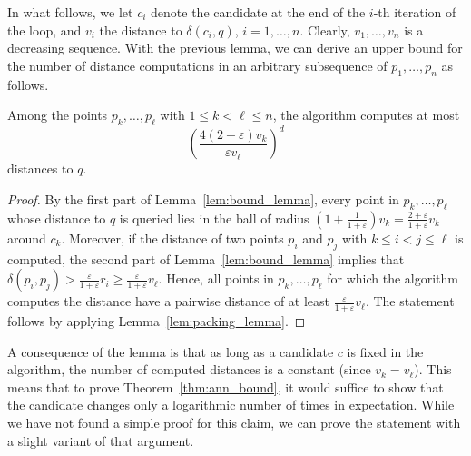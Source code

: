 \documentclass[a4paper,USenglish]{socg-lipics-v2018}
\newcommand{\eps}{\varepsilon}
\newcommand{\dist}{\delta}
\begin{document}
In what follows, we let $c_i$ denote the candidate
at the end of the $i$-th iteration of the loop, and $v_i$
the distance to $\dist(c_i, q)$, $i = 1, \dots, n$. Clearly, $v_1,\ldots,v_n$ is a decreasing sequence.
With the previous lemma, we can derive an upper bound for the number
of distance computations in an arbitrary subsequence of $p_1,\ldots,p_n$
as follows. 

\begin{lemma}
\label{lem:sequence_lemma}
Among the points $p_k,\ldots,p_\ell$ with $1\leq k< \ell\leq n$, the algorithm computes at most
\[\left(\frac{4(2+\eps) v_k}{\eps v_\ell}\right)^{d}\]
distances to $q$.
\end{lemma}
\begin{proof}
By the first part of Lemma~\ref{lem:bound_lemma}, every point in $p_k,\ldots,p_\ell$
whose distance to $q$ is queried lies in the ball of radius $(1+\frac{1}{1+\eps})v_k=\frac{2+\eps}{1+\eps} v_k$
around $c_k$. Moreover, if the distance of two points $p_i$ and $p_j$ with $k\leq i<j\leq\ell$
is computed, the second part of Lemma~\ref{lem:bound_lemma} implies that $\dist(p_i,p_j)> \frac{\eps}{1+\eps}r_i\geq \frac{\eps}{1+\eps}v_\ell$.
Hence, all points in $p_k,\ldots,p_\ell$ for which the algorithm computes the distance
have a pairwise distance of at least $\frac{\eps}{1+\eps}v_\ell$. The statement follows by applying Lemma~\ref{lem:packing_lemma}.
\end{proof}

A consequence of the lemma is that as long as a candidate $c$ is fixed in the algorithm,
the number of computed distances is a constant (since $v_k=v_\ell$). 
This means that to prove Theorem~\ref{thm:ann_bound}, it would suffice to show
that the candidate changes only a logarithmic number of times in expectation.
While we have not found a simple proof for this claim, we can prove the statement with a slight variant of
that argument.
\end{document}
